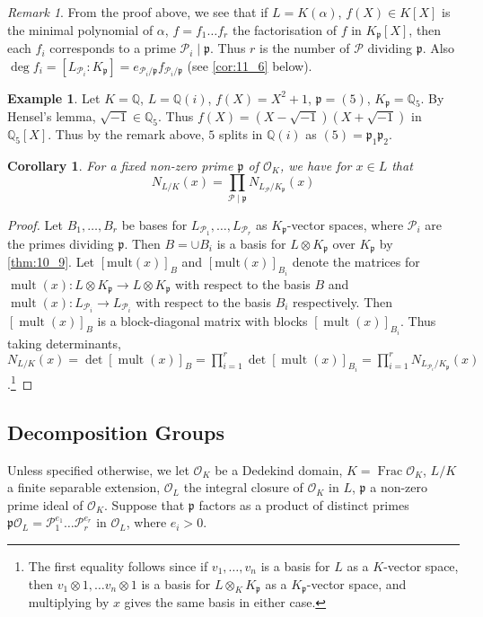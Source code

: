 \documentclass[11pt]{article}
\theoremstyle{definition}
\newtheorem*{example}{Example}
\theoremstyle{plain}
\newtheorem{corollary}[definition]{Corollary}
\theoremstyle{remark}
\newtheorem*{remark}{Remark}
\DeclareMathOperator{\Frac}{Frac}
\DeclareMathOperator{\mult}{mult}
\newcommand{\QQ}{\mathbb{Q}}
\newcommand{\cO}{\mathcal{O}}
\newcommand{\cP}{\mathcal{P}}
\newcommand{\fp}{\mathfrak{p}}
\begin{document}
\begin{remark}
    From the proof above, we see that if $L = K(\alpha)$, $f(X) \in K[X]$ is the minimal polynomial of $\alpha$, $f = f_1 \ldots f_r$ the factorisation of $f$ in $K_\fp[X]$, then each $f_i$ corresponds to a prime $\cP_i \mid \fp$. Thus $r$ is the number of $\cP$ dividing $\fp$. Also $\deg f_i = [L_{\cP_i} : K_\fp] = e_{\cP_i/\fp} f_{\cP_i/\fp}$ (see \autoref{cor:11_6} below).
\end{remark}

\begin{example}
    Let $K = \QQ$, $L = \QQ(i)$, $f(X) = X^2 + 1$, $\fp = (5)$, $K_\fp = \QQ_5$. By Hensel's lemma, $\sqrt{-1} \in \QQ_5$. Thus $f(X) = (X - \sqrt{-1})(X + \sqrt{-1})$ in $\QQ_5[X]$. Thus by the remark above, $5$ splits in $\QQ(i)$ as $(5) = \fp_1 \fp_2$.
\end{example}

\begin{corollary}\label{cor:10_10}
    For a fixed non-zero prime $\fp$ of $\cO_K$, we have for $x \in L$ that
    \begin{equation*}
        N_{L/K}(x) = \prod_{\cP \mid \fp} N_{L_\cP/K_\fp}(x)
    \end{equation*}
\end{corollary}
\begin{proof}
    Let $B_1, \ldots, B_r$ be bases for $L_{\cP_1}, \ldots, L_{\cP_r}$ as $K_\fp$-vector spaces, where $\cP_i$ are the primes dividing $\fp$. Then $B = \cup B_i$ is a basis for $L \otimes K_\fp$ over $K_\fp$ by \autoref{thm:10_9}. Let $[\mathrm{mult}(x)]_B$ and $[\mathrm{mult}(x)]_{B_i}$ denote the matrices for $\mult(x) : L \otimes K_\fp \to L \otimes K_\fp$ with respect to the basis $B$ and $\mult(x) : L_{\cP_i} \to L_{\cP_i}$ with respect to the basis $B_i$ respectively. Then $[\mult(x)]_B$ is a block-diagonal matrix with blocks $[\mult(x)]_{B_i}$. Thus taking determinants, $N_{L/K}(x) = \det [\mult(x)]_B = \prod_{i=1}^r \det [\mult(x)]_{B_i} = \prod_{i=1}^r N_{L_{\cP_i} / K_\fp}(x)$.\footnote{The first equality follows since if $v_1, \ldots, v_n$ is a basis for $L$ as a $K$-vector space, then $v_1 \otimes 1, \ldots v_n \otimes 1$ is a basis for $L \otimes_K K_\fp$ as a $K_\fp$-vector space, and multiplying by $x$ gives the same basis in either case.}
\end{proof}

\subsection{Decomposition Groups}
Unless specified otherwise, we let $\cO_K$ be a Dedekind domain, $K = \Frac{\cO_K}$, $L / K$ a finite separable extension, $\cO_L$ the integral closure of $\cO_K$ in $L$, $\fp$ a non-zero prime ideal of $\cO_K$. Suppose that $\fp$ factors as a product of distinct primes $\fp \cO_L = \cP_1^{e_1} \ldots \cP_r^{e_r}$ in $\cO_L$, where $e_i > 0$.
\end{document}

